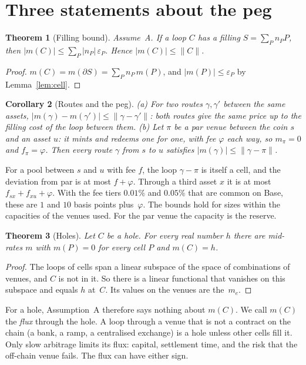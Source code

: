 \documentclass[11pt]{article}
\newtheorem{theorem}{Theorem}
\newtheorem{corollary}[theorem]{Corollary}
\theoremstyle{definition}
\theoremstyle{remark}
\newcommand{\eps}{\varepsilon}
\newcommand{\fc}[1]{\lVert #1\rVert}
\begin{document}
\section{Three statements about the peg}

\begin{theorem}[Filling bound]\label{thm:fill}
Assume~A. If a loop $C$ has a filling $S=\sum_Pn_PP$, then $|m(C)|\le\sum_P|n_P|\,\eps_P$. Hence $|m(C)|\le\fc{C}$.
\end{theorem}

\begin{proof}
$m(C)=m(\partial S)=\sum_Pn_P\,m(P)$, and $|m(P)|\le\eps_P$ by Lemma~\ref{lem:cell}.
\end{proof}

\begin{corollary}[Routes and the peg]\label{cor:peg}
\textup{(a)} For two routes $\gamma,\gamma'$ between the same assets, $|m(\gamma)-m(\gamma')|\le\fc{\gamma-\gamma'}$: both routes give the same price up to the filling cost of the loop between them.
\textup{(b)} Let $\pi$ be a \emph{par venue} between the coin $s$ and an asset $u$: it mints and redeems one for one, with fee $\varphi$ each way, so $m_\pi=0$ and $f_\pi=\varphi$. Then every route $\gamma$ from $s$ to $u$ satisfies $|m(\gamma)|\le\fc{\gamma-\pi}$.
\end{corollary}

For a pool between $s$ and $u$ with fee $f$, the loop $\gamma-\pi$ is itself a cell, and the deviation from par is at most $f+\varphi$. Through a third asset $x$ it is at most $f_{sx}+f_{xu}+\varphi$. With the fee tiers $0.01\%$ and $0.05\%$ that are common on Base, these are $1$ and $10$ basis points plus~$\varphi$. The bounds hold for sizes within the capacities of the venues used. For the par venue the capacity is the reserve.

\begin{theorem}[Holes]\label{thm:hole}
Let $C$ be a hole. For every real number $h$ there are mid-rates $m$ with $m(P)=0$ for every cell $P$ and $m(C)=h$.
\end{theorem}

\begin{proof}
The loops of cells span a linear subspace of the space of combinations of venues, and $C$ is not in it. So there is a linear functional that vanishes on this subspace and equals $h$ at~$C$. Its values on the venues are the~$m_e$.
\end{proof}

For a hole, Assumption~A therefore says nothing about $m(C)$. We call $m(C)$ the \emph{flux} through the hole. A loop through a venue that is not a contract on the chain (a bank, a ramp, a centralised exchange) is a hole unless other cells fill it. Only slow arbitrage limits its flux: capital, settlement time, and the risk that the off-chain venue fails. The flux can have either sign.
\end{document}

